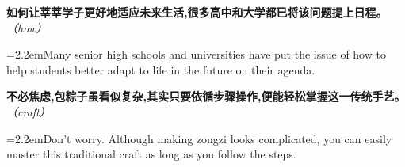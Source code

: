\documentclass[11pt,a4paper]{article}
\newcommand{\num}[1]{\makebox[1.9em][r]{#1.}\hspace{0.3em}}
\newcommand{\prompt}[1]{\emph{\textcolor{tipblue}{\small（#1）}}}
\begin{document}
\begin{minipage}{\linewidth}

\num{11}\textbf{如何让莘莘学子更好地适应未来生活,很多高中和大学都已将该问题提上日程。}\prompt{how}

\vspace{0.15em}

\noindent\hangindent=2.2em\hspace{2.2em}Many senior high schools and universities have put the issue of how to help students better adapt to life in the future on their agenda.

\end{minipage}

\begin{minipage}{\linewidth}

\num{12}\textbf{不必焦虑,包粽子虽看似复杂,其实只要依循步骤操作,便能轻松掌握这一传统手艺。}\prompt{craft}

\vspace{0.15em}

\noindent\hangindent=2.2em\hspace{2.2em}Don’t worry. Although making zongzi looks complicated, you can easily master this traditional craft as long as you follow the steps.

\end{minipage}
\end{document}
